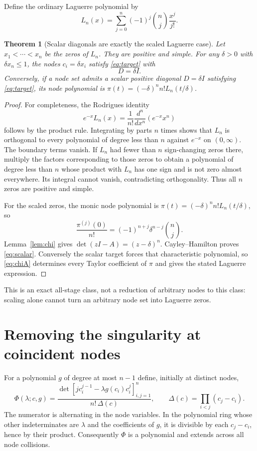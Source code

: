 \documentclass[11pt]{article}
\newtheorem{theorem}{Theorem}[section]
\theoremstyle{remark}\newtheorem{remark}[theorem]{Remark}
\begin{document}
Define the ordinary Laguerre polynomial by
\[
 L_n(x)=\sum_{j=0}^n(-1)^j\binom nj\frac{x^j}{j!}.
\]
\begin{theorem}[Scalar diagonals are exactly the scaled Laguerre case]\label{thm:laguerre}
Let $x_1<\cdots<x_n$ be the zeros of $L_n$. They are positive and simple.
For any $\delta>0$ with $\delta x_n\le1$, the nodes $c_i=\delta x_i$ satisfy
\eqref{eq:target} with
\begin{equation}\label{eq:scalar}
 D=\delta I.
\end{equation}
Conversely, if a node set admits a scalar positive diagonal $D=\delta I$
satisfying \eqref{eq:target}, its node polynomial is
$\pi(t)=(-\delta)^n n!L_n(t/\delta)$.
\end{theorem}
\begin{proof}
For completeness, the Rodrigues identity
\[
 e^{-x}L_n(x)=\frac1{n!}\frac{d^n}{dx^n}(e^{-x}x^n)
\]
follows by the product rule. Integrating by parts $n$ times shows that $L_n$
is orthogonal to every polynomial of degree less than $n$ against $e^{-x}$
on $(0,\infty)$. The boundary terms vanish. If $L_n$ had fewer than $n$
sign-changing zeros there, multiply the factors corresponding to those zeros
to obtain a polynomial of degree less than $n$ whose product with $L_n$ has
one sign and is not zero almost everywhere. Its integral cannot vanish,
contradicting orthogonality. Thus all $n$ zeros are positive and simple.

For the scaled zeros, the monic node polynomial is
$\pi(t)=(-\delta)^n n!L_n(t/\delta)$, so
\[
 \frac{\pi^{(j)}(0)}{n!}=(-1)^{n+j}\delta^{n-j}\binom nj.
\]
Lemma~\ref{lem:chi} gives $\det(zI-A)=(z-\delta)^n$.
Cayley--Hamilton proves \eqref{eq:scalar}. Conversely the scalar target forces
that characteristic polynomial, so \eqref{eq:chiA} determines every Taylor
coefficient of $\pi$ and gives the stated Laguerre expression.
\end{proof}
This is an exact all-stage class, not a reduction of arbitrary nodes to this
class: scaling alone cannot turn an arbitrary node set into Laguerre zeros.

\section{Removing the singularity at coincident nodes}\label{sec:regularization}
For a polynomial $g$ of degree at most $n-1$ define, initially at distinct nodes,
\begin{equation}\label{eq:Phi}
 \Phi(\lambda;c,g)=
 \frac{\det[jc_i^{j-1}-\lambda g(c_i)c_i^j]_{i,j=1}^n}
 {n!\,\Delta(c)},\qquad
 \Delta(c)=\prod_{i<j}(c_j-c_i).
\end{equation}
The numerator is alternating in the node variables. In the polynomial ring
whose other indeterminates are $\lambda$ and the coefficients of $g$, it is
divisible by each $c_j-c_i$, hence by their product. Consequently $\Phi$ is a
polynomial and extends across all node collisions.
\end{document}
